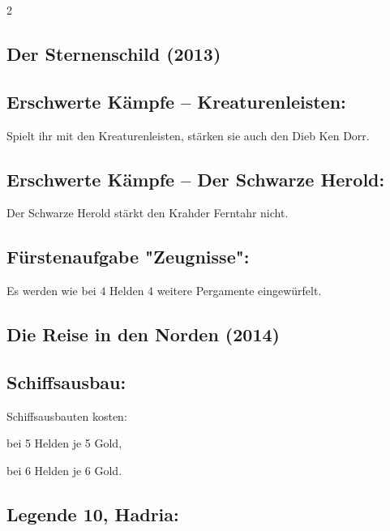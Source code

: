 \documentclass[10pt, a4paper, oneside]{book}
\begin{document}
\begin{multicols*}{2}
\begin{bgcolor}
\end{bgcolor}



\begin{bgcolor}
\section{Der Sternenschild (2013)}


\subsection{Erschwerte Kämpfe – Kreaturenleisten:}

Spielt ihr mit den Kreaturenleisten, stärken sie auch den Dieb Ken Dorr.
\supercite{nh-begleitheft}

\subsection{Erschwerte Kämpfe – Der Schwarze Herold:} 

Der Schwarze Herold stärkt den Krahder Ferntahr nicht.
\supercite{nh-begleitheft}


\subsection{Fürstenaufgabe "Zeugnisse":}

Es werden wie bei 4 Helden 4 weitere Pergamente eingewürfelt.
\supercite{nh-begleitheft}

\end{bgcolor}





\begin{bgcolor}
\section{Die Reise in den Norden (2014)}


\subsection{Schiffsausbau:}

Schiffsausbauten kosten:
\supercite{dridn-begleitheft}

\bullet{} bei 5 Helden je 5 Gold,

\bullet{} bei 6 Helden je 6 Gold.



\subsection{Legende 10, Hadria:}


\end{bgcolor}
\end{multicols*}
\end{document}
